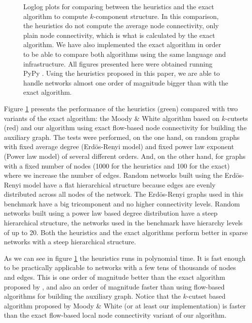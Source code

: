 \begin{figure}[h]
\begin{minipage}{\textwidth}
\caption[Loglog plots for comparing between heuristics and exact algorithms]{Loglog plots for comparing between the heuristics and the exact algorithm to compute $k$-component structure. In this comparison, the heuristics do not compute the average node connectivity, only plain node connectivity, which is what is calculated by the exact algorithm. We have also implemented the exact algorithm in order to be able to compare both algorithms using the same language and infrastructure. All figures presented here were obtained running PyPy \citep{bolz:2009}. Using the heuristics proposed in this paper, we are able to handle networks almost one order of magnitude bigger than with the exact algorithm.}
\label{fig:performance}
\end{minipage}
\end{figure}

Figure \ref{fig:performance} presents the performance of the heuristics (green) compared with two variants of the exact algorithm: the Moody \& White algorithm based on $k$-cutsets (red) and our algorithm using exact flow-based node connectivity for building the auxiliary graph. The tests were performed, on the one hand, on random graphs with fixed average degree (Erdös-Renyi model) and fixed power law exponent (Power law model) of several different orders. And, on the other hand, for graphs with a fixed number of nodes (1000 for the heuristics and 100 for the exact) where we increase the number of edges. Random networks built using the Erdös-Renyi model have a flat hierarchical structure because edges are evenly distributed across all nodes of the network. The Erdös-Renyi graphs used in this benchmark have a big tricomponent and no higher connectivity levels. Random networks built using a power law based degree distribution have a steep hierarchical structure, the networks used in the benchmark have hierarchy levels of up to 20. Both the heuristics and the exact algorithms perform better in sparse networks with a steep hierarchical structure.

As we can see in figure \ref{fig:performance} the heuristics runs in polynomial time. It is fast enough to be practically applicable to networks with a few tens of thousands of nodes and edges. This is one order of magnitude better than the exact algorithm proposed by \citet{moody:2003}, and also an order of magnitude faster than using flow-based algorithms for building the auxiliary graph. Notice that the $k$-cutset based algorithm proposed by Moody \& White (or at least our implementation) is faster than the exact flow-based local node connectivity variant of our algorithm.

